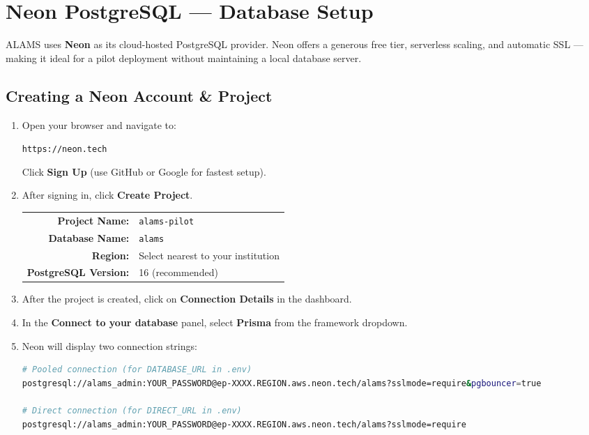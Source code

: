 \chapter{Neon PostgreSQL — Database Setup}
\label{ch:database}

ALAMS uses \textbf{Neon} as its cloud-hosted PostgreSQL provider. Neon offers a generous free tier, serverless scaling, and automatic SSL — making it ideal for a pilot deployment without maintaining a local database server.

\section{Creating a Neon Account \& Project}

\begin{enumerate}[leftmargin=*, label=\textbf{Step \arabic*.}]

\item Open your browser and navigate to:
\begin{center}
\texttt{\textcolor{aurxonblue}{https://neon.tech}}
\end{center}
Click \textbf{Sign Up} (use GitHub or Google for fastest setup).

\item After signing in, click \textbf{Create Project}.

\begin{tcolorbox}[alamsbox, title={\faFill\quad Project Settings}]
\begin{tabular}{rl}
\textbf{Project Name:} & \texttt{alams-pilot}\\
\textbf{Database Name:} & \texttt{alams}\\
\textbf{Region:} & Select nearest to your institution\\
\textbf{PostgreSQL Version:} & 16 (recommended)\\
\end{tabular}
\end{tcolorbox}

\item After the project is created, click on \textbf{Connection Details} in the dashboard.

\item In the \textbf{Connect to your database} panel, select \textbf{Prisma} from the framework dropdown.

\item Neon will display two connection strings:

\begin{tcolorbox}[codebox, title={Connection Strings from Neon Dashboard}]
\begin{lstlisting}[language=bash]
# Pooled connection (for DATABASE_URL in .env)
postgresql://alams_admin:YOUR_PASSWORD@ep-XXXX.REGION.aws.neon.tech/alams?sslmode=require&pgbouncer=true

# Direct connection (for DIRECT_URL in .env)
postgresql://alams_admin:YOUR_PASSWORD@ep-XXXX.REGION.aws.neon.tech/alams?sslmode=require
\end{lstlisting}
\end{tcolorbox}

\end{enumerate}

